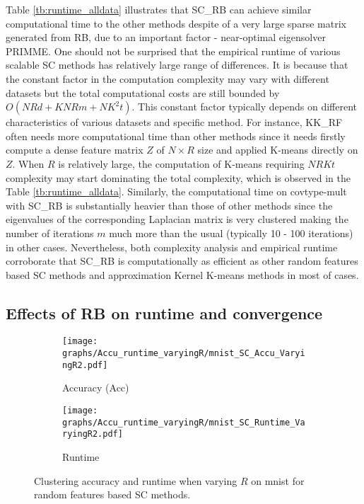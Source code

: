 \documentclass[sigconf]{acmart}
\newcommand{\1}{\boldsymbol{1}}
\newcommand{\0}{\boldsymbol{0}}
\begin{document}
Table \ref{tb:runtime_alldata} illustrates that SC\_RB can achieve similar computational time to the other methods despite of a very large sparse matrix generated from RB, due to an important factor - near-optimal eigensolver PRIMME.
One should not be surprised that the empirical runtime of various scalable SC methods has relatively large range of differences. It is because that the constant factor in the computation complexity may vary with different datasets but the total computational costs are still bounded by $O(NRd+KNRm+NK^2t)$. This constant factor typically depends on different characteristics of various datasets and specific method. For instance, KK\_RF often needs more computational time than other methods since it needs firstly compute a dense feature matrix $Z$ of $N \times R$ size and applied K-means directly on $Z$. When $R$ is relatively large, the computation of K-means requiring $NRKt$ complexity may start dominating the total complexity, which is observed in the Table \ref{tb:runtime_alldata}. Similarly, the computational time on covtype-mult with SC\_RB is substantially heavier than those of other methods since the eigenvalues of the corresponding Laplacian matrix is very clustered making the number of iterations $m$ much more than the usual (typically 10 - 100 iterations) in other cases. Nevertheless, both complexity analysis and empirical runtime corroborate that SC\_RB is computationally as efficient as other random features based SC methods and approximation Kernel K-means methods in most of cases. 


\subsection{Effects of RB on runtime and convergence}

\begin{figure}[!htb]
\centering
	  \begin{subfigure}[b]{0.23\textwidth}
      \texttt{[image: graphs/Accu\_runtime\_varyingR/mnist\_SC\_Accu\_VaryingR2.pdf]}
      \caption{Accuracy (Acc)}
      \label{fig:Accu_varyingR_mnist}
      \end{subfigure}
	  \begin{subfigure}[b]{0.23\textwidth}
      \texttt{[image: graphs/Accu\_runtime\_varyingR/mnist\_SC\_Runtime\_VaryingR2.pdf]}
      \caption{Runtime}
      \label{fig:Runtime_varyingR_mnist}
      \end{subfigure}
\caption{Clustering accuracy and runtime when varying $R$ on mnist for random features based SC methods.}
 \vspace{0mm}
\label{fig:Accu_runtime_varyingR_mnist}
\end{figure}
\end{document}
